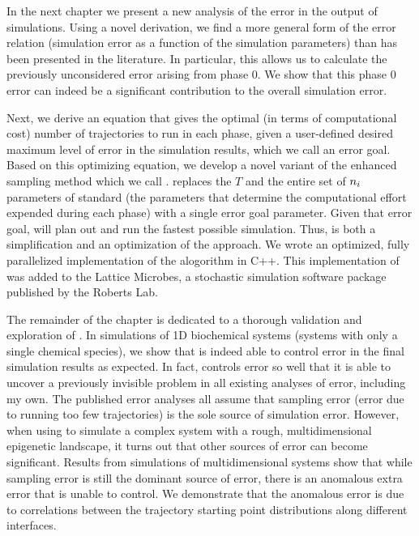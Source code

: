 In the next chapter we present a new analysis of the error in the output of  simulations. Using a novel derivation, we find a more general form of the  error relation (\ie simulation error as a function of the simulation parameters) than has been presented in the literature\cite{Allen:2006ch,Borrero:2008il,Allen:2009kb}. In particular, this allows us to calculate the previously unconsidered error arising from phase $0$. We show that this phase $0$ error can indeed be a significant contribution to the overall simulation error.

Next, we derive an equation that gives the optimal (in terms of computational cost) number of trajectories to run in each phase, given a user-defined desired maximum level of error in the simulation results, which we call an error goal. Based on this optimizing equation, we develop a novel variant of the  enhanced sampling method which we call .  replaces the $T$ and the entire set of $n_{i}$ parameters of standard  (\ie the parameters that determine the computational effort expended during each phase) with a single error goal parameter. Given that error goal,  will plan out and run the fastest possible  simulation. Thus,  is both a simplification and an optimization of the  approach. We wrote an optimized, fully parallelized implementation of the  alogorithm in C++. This implementation of  was added to the Lattice Microbes\cite{Roberts:2013cu}, a stochastic simulation software package published by the Roberts Lab.

The remainder of the chapter is dedicated to a thorough validation and exploration of . In simulations of 1D biochemical systems (\ie systems with only a single chemical species), we show that  is indeed able to control error in the final simulation results as expected. In fact,  controls error so well that it is able to uncover a previously invisible problem in all existing analyses of  error, including my own. The published error analyses\cite{Allen:2006ch,Borrero:2008il,Allen:2009kb} all assume that sampling error (\ie error due to running too few trajectories) is the sole source of simulation error. However, when using  to simulate a complex system with a rough, multidimensional epigenetic landscape, it turns out that other sources of error can become significant. Results from  simulations of multidimensional systems show that while sampling error is still the dominant source of error, there is an anomalous extra error that  is unable to control. We demonstrate that the anomalous error is due to correlations between the trajectory starting point distributions along different interfaces.


